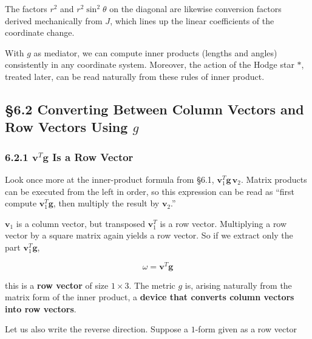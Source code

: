\documentclass[a4paper,12pt,openany]{book}
\begin{document}
The factors \(r^2\) and \(r^2\sin^2\theta\) on the diagonal are likewise
conversion factors derived mechanically from \(J\), which lines up the
linear coefficients of the coordinate change.

With \(g\) as mediator, we can compute inner products (lengths and
angles) consistently in any coordinate system. Moreover, the action of
the Hodge star \(\ast\), treated later, can be read naturally from these
rules of inner product.

\par\vspace{0.35em}\par

\hypertarget{converting-between-column-vectors-and-row-vectors-using-g}{%
\subsection{\texorpdfstring{§6.2 Converting Between Column Vectors and
Row Vectors Using
\(g\)}{§6.2 Converting Between Column Vectors and Row Vectors Using g}}\label{converting-between-column-vectors-and-row-vectors-using-g}}

\hypertarget{mathbfvt-mathbfg-is-a-row-vector}{%
\subsubsection{\texorpdfstring{6.2.1 \(\mathbf{v}^T \mathbf{g}\) Is a
Row
Vector}{6.2.1 \textbackslash mathbf\{v\}\^{}T \textbackslash mathbf\{g\} Is a Row Vector}}\label{mathbfvt-mathbfg-is-a-row-vector}}

Look once more at the inner-product formula from §6.1,
\(\mathbf{v}_1^T \mathbf{g} \,\mathbf{v}_2\). Matrix products can be
executed from the left in order, so this expression can be read as
``first compute \(\mathbf{v}_1^T \mathbf{g}\), then multiply the result
by \(\mathbf{v}_2\).''

\(\mathbf{v}_1\) is a column vector, but transposed \(\mathbf{v}_1^T\)
is a row vector. Multiplying a row vector by a square matrix again
yields a row vector. So if we extract only the part
\(\mathbf{v}_1^T \mathbf{g}\),

\[\omega = \mathbf{v}^T \mathbf{g}\]

this is a \textbf{row vector} of size \(1 \times 3\). The metric \(g\)
is, arising naturally from the matrix form of the inner product, a
\textbf{device that converts column vectors into row vectors}.

Let us also write the reverse direction. Suppose a \(1\)-form given as a
row vector
\end{document}
